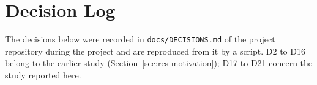 \section{Decision Log}
\label{app:decisions}

The decisions below were recorded in \texttt{docs/DECISIONS.md} of the project repository during the project and are
reproduced from it by a script. D2 to D16 belong to the earlier study (Section~\ref{sec:res-motivation}); D17 to D21
concern the study reported here.


